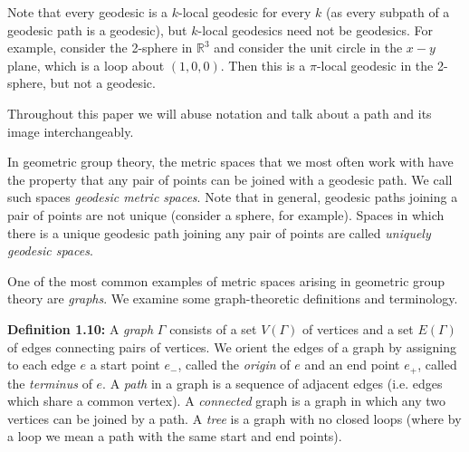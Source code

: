 \documentclass[12pt]{article}
\newcommand{\vs}{\vskip10pt}
\begin{document}
	Note that every geodesic is a $k$-local geodesic for every $k$ (as every subpath of a geodesic path is a geodesic), but $k$-local geodesics need not be geodesics. For example, consider the 2-sphere in $\mathbb{R}^3$ and consider the unit circle in the $x-y$ plane, which is a loop about $(1,0,0)$. Then this is a $\pi$-local geodesic in the 2-sphere, but not a geodesic.
	
	\vs
	
	Throughout this paper we will abuse notation and talk about a path and its image interchangeably. 
	
	\vs 
	
	In geometric group theory, the metric spaces that we most often work with have the property that any pair of points can be joined with a geodesic path. We call such spaces \textit{geodesic metric spaces}. Note that in general, geodesic paths joining a pair of points are not unique (consider a sphere, for example). Spaces in which there is a unique geodesic path joining any pair of points are called \textit{uniquely geodesic spaces}. 
	
	\vs 
	
	One of the most common examples of metric spaces arising in geometric group theory are \textit{graphs}. We examine some graph-theoretic definitions and terminology.
	
	\vs 
	
	\textbf{Definition 1.10: } A \textit{graph} $\Gamma$ consists of a set $V(\Gamma)$ of vertices and a set $E(\Gamma)$ of edges connecting pairs of vertices. We orient the edges of a graph by assigning to each edge $e$ a start point $e_{-}$, called the \textit{origin} of $e$ and an end point $e_{+}$, called the \textit{terminus} of $e$. A \textit{path} in a graph is a sequence of adjacent edges (i.e. edges which share a common vertex). A \textit{connected} graph is a graph in which any two vertices can be joined by a path. A \textit{tree} is a graph with no closed loops (where by a loop we mean a path with the same start and end points). 
	
	\vs
	
\end{document}
